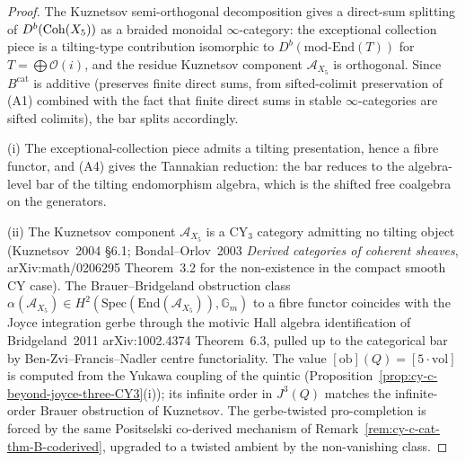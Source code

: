 \begin{proof}
The Kuznetsov semi-orthogonal decomposition gives a direct-sum
splitting of $D^b(\mathrm{Coh}(X_5))$ as a braided monoidal
$\infty$-category: the exceptional collection piece is a tilting-type
contribution isomorphic to $D^b(\mathrm{mod}\text{-}\mathrm{End}(T))$
for $T = \bigoplus \mathcal O(i)$, and the residue Kuznetsov component
$\mathcal A_{X_5}$ is orthogonal. Since $B^{\mathrm{cat}}$ is additive
(preserves finite direct sums, from sifted-colimit preservation of
(A1) combined with the fact that finite direct sums in stable
$\infty$-categories are sifted colimits), the bar splits accordingly.

(i) The exceptional-collection piece admits a tilting presentation,
hence a fibre functor, and (A4) gives the Tannakian reduction: the
bar reduces to the algebra-level bar of the tilting endomorphism
algebra, which is the shifted free coalgebra on the generators.

(ii) The Kuznetsov component $\mathcal A_{X_5}$ is a CY$_3$ category
admitting no tilting object (Kuznetsov~2004 \S6.1; Bondal--Orlov~2003
\emph{Derived categories of coherent sheaves}, arXiv:math/0206295
Theorem~3.2 for the non-existence in the compact smooth CY case).
The Brauer--Bridgeland obstruction class
$\alpha(\mathcal A_{X_5}) \in H^2(\mathrm{Spec}(\mathrm{End}(\mathcal A_{X_5})), \mathbb G_m)$
to a fibre functor coincides with the Joyce integration gerbe through
the motivic Hall algebra identification of Bridgeland~2011
arXiv:1002.4374 Theorem~6.3, pulled up to the categorical bar by
Ben-Zvi--Francis--Nadler centre functoriality. The value
$[\mathrm{ob}](Q) = [5 \cdot \mathrm{vol}]$ is computed from the
Yukawa coupling of the quintic
(Proposition~\ref{prop:cy-c-beyond-joyce-three-CY3}(i)); its
infinite order in $J^3(Q)$ matches the infinite-order Brauer
obstruction of Kuznetsov. The gerbe-twisted pro-completion is forced
by the same Positselski co-derived mechanism of
Remark~\ref{rem:cy-c-cat-thm-B-coderived}, upgraded to a twisted
ambient by the non-vanishing class.
\end{proof}

